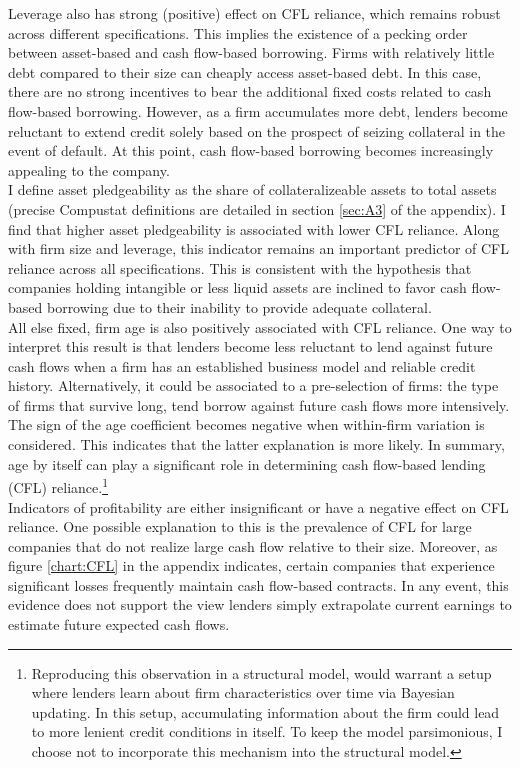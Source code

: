 \documentclass[12pt]{article}
\begin{document}
Leverage also has strong (positive) effect on CFL reliance, which remains robust across different specifications. This implies the existence of a pecking order between asset-based and cash flow-based borrowing. Firms with relatively little debt compared to their size can cheaply access asset-based debt. In this case, there are no strong incentives to bear the additional fixed costs related to cash flow-based borrowing. However, as a firm accumulates more debt, lenders become reluctant to extend credit solely based on the prospect of seizing collateral in the event of default. At this point, cash flow-based borrowing becomes increasingly appealing to the company. \vspace{3mm} \\
I define asset pledgeability as the share of collateralizeable assets to total assets (precise Compustat definitions are detailed in section \ref{sec:A3} of the appendix). I find that higher asset pledgeability is associated with lower CFL reliance. Along with firm size and leverage, this indicator remains an important predictor of CFL reliance across all specifications. This is consistent with the hypothesis that companies holding intangible or less liquid assets are inclined to favor cash flow-based borrowing due to their inability to provide adequate collateral.  \vspace{3mm} \\
All else fixed, firm age is also positively associated with CFL reliance. One way to interpret this result is that lenders become less reluctant to lend against future cash flows when a firm has an established business model and reliable credit history. Alternatively, it could be associated to a pre-selection of firms: the type of firms that survive long, tend borrow against future cash flows more intensively. The sign of the age coefficient becomes negative when within-firm variation is considered. This indicates that the latter explanation is more likely. In summary, age by itself can play a significant role in determining cash flow-based lending (CFL) reliance.\footnote{Reproducing this observation in a structural model, would warrant a setup where lenders learn about firm characteristics over time via Bayesian updating. In this setup, accumulating information about the firm could lead to more lenient credit conditions in itself. To keep the model parsimonious, I choose not to incorporate this mechanism into the structural model.}
\vspace{3mm} \\
Indicators of profitability are either insignificant or have a negative effect on CFL reliance.  One possible explanation to this is the prevalence of CFL for large companies that do not realize large cash flow relative to their size. Moreover, as figure \ref{chart:CFL} in the appendix indicates, certain companies that experience significant losses frequently maintain cash flow-based contracts. In any event, this evidence does not support the view lenders simply extrapolate current earnings to estimate future expected cash flows. \vspace{3mm} \\
\end{document}
